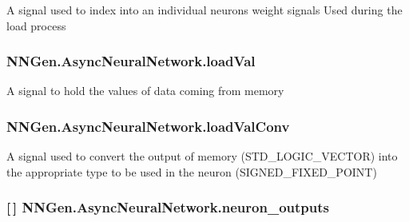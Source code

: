 A signal used to index into an individual neuron\textquotesingle{}s weight signals Used during the load process 

\hypertarget{class_n_n_gen_1_1_async_neural_network_aced8cd708a7084592d28cbcca93a7278}{}
\subsubsection[{load\+Val}]{ N\+N\+Gen.\+Async\+Neural\+Network.\+load\+Val\hspace{0.3cm}{\ttfamily [get]}}\label{class_n_n_gen_1_1_async_neural_network_aced8cd708a7084592d28cbcca93a7278}


A signal to hold the values of data coming from memory 

\hypertarget{class_n_n_gen_1_1_async_neural_network_a559b0be95e6e62b80a0064de584805d3}{}
\subsubsection[{load\+Val\+Conv}]{ N\+N\+Gen.\+Async\+Neural\+Network.\+load\+Val\+Conv\hspace{0.3cm}{\ttfamily [get]}}\label{class_n_n_gen_1_1_async_neural_network_a559b0be95e6e62b80a0064de584805d3}


A signal used to convert the output of memory (S\+T\+D\+\_\+\+L\+O\+G\+I\+C\+\_\+\+V\+E\+C\+T\+O\+R) into the appropriate type to be used in the neuron (S\+I\+G\+N\+E\+D\+\_\+\+F\+I\+X\+E\+D\+\_\+\+P\+O\+I\+N\+T) 

\hypertarget{class_n_n_gen_1_1_async_neural_network_ac912fc0d486aeb193cf0f104f06b68a4}{}
\subsubsection[{neuron\+\_\+outputs}]{ \mbox{[}$\,$\mbox{]} N\+N\+Gen.\+Async\+Neural\+Network.\+neuron\+\_\+outputs\hspace{0.3cm}{\ttfamily [get]}}\label{class_n_n_gen_1_1_async_neural_network_ac912fc0d486aeb193cf0f104f06b68a4}



